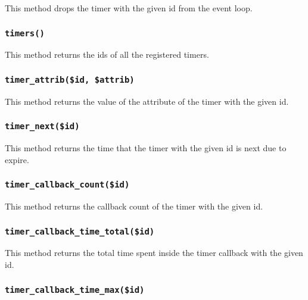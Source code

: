 This method drops the timer with the given id from the event loop.

\subsubsection*{\texttt{timers()}\label{xPL::Listener_timers_}}


This method returns the ids of all the registered timers.

\subsubsection*{\texttt{timer\_attrib(\$id, \$attrib)}\label{xPL::Listener_timer_attrib_id_attrib_}}


This method returns the value of the attribute of the timer with the
given id.

\subsubsection*{\texttt{timer\_next(\$id)}\label{xPL::Listener_timer_next_id_}}


This method returns the time that the timer with the given id is next
due to expire.

\subsubsection*{\texttt{timer\_callback\_count(\$id)}\label{xPL::Listener_timer_callback_count_id_}}


This method returns the callback count of the timer with the given id.

\subsubsection*{\texttt{timer\_callback\_time\_total(\$id)}\label{xPL::Listener_timer_callback_time_total_id_}}


This method returns the total time spent inside the timer callback with
the given id.

\subsubsection*{\texttt{timer\_callback\_time\_max(\$id)}\label{xPL::Listener_timer_callback_time_max_id_}}


